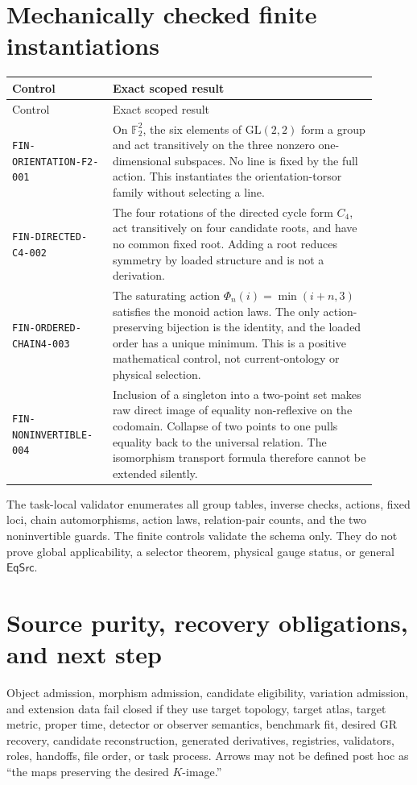 \documentclass[11pt]{article}
\begin{document}
\section{Mechanically checked finite instantiations}

\begin{longtable}{p{0.24\linewidth}p{0.66\linewidth}}
\toprule
Control & Exact scoped result \\
\midrule
\endfirsthead
\toprule
Control & Exact scoped result \\
\midrule
\endhead
\texttt{FIN-ORIENTATION-F2-001} & On \(\mathbb F_2^2\), the six elements of
\(\mathrm{GL}(2,2)\) form a group and act transitively on the three nonzero
one-dimensional subspaces. No line is fixed by the full action. This
instantiates the orientation-torsor family without selecting a line. \\
\texttt{FIN-DIRECTED-C4-002} & The four rotations of the directed cycle form
\(C_4\), act transitively on four candidate roots, and have no common fixed
root. Adding a root reduces symmetry by loaded structure and is not a
derivation. \\
\texttt{FIN-ORDERED-CHAIN4-003} & The saturating action
\(\Phi_n(i)=\min(i+n,3)\) satisfies the monoid action laws. The only
action-preserving bijection is the identity, and the loaded order has a unique
minimum. This is a positive mathematical control, not current-ontology or
physical selection. \\
\texttt{FIN-NONINVERTIBLE-004} & Inclusion of a singleton into a two-point set
makes raw direct image of equality non-reflexive on the codomain. Collapse of
two points to one pulls equality back to the universal relation. The
isomorphism transport formula therefore cannot be extended silently. \\
\bottomrule
\end{longtable}

The task-local validator enumerates all group tables, inverse checks, actions,
fixed loci, chain automorphisms, action laws, relation-pair counts, and the two
noninvertible guards. The finite controls validate the schema only. They do not
prove global applicability, a selector theorem, physical gauge status, or
general \(\mathsf{EqSrc}\).

\section{Source purity, recovery obligations, and next step}

Object admission, morphism admission, candidate eligibility, variation
admission, and extension data fail closed if they use target topology, target
atlas, target metric, proper time, detector or observer semantics, benchmark
fit, desired GR recovery, candidate reconstruction, generated derivatives,
registries, validators, roles, handoffs, file order, or task process. Arrows may
not be defined post hoc as ``the maps preserving the desired \(K\)-image.''
\end{document}
